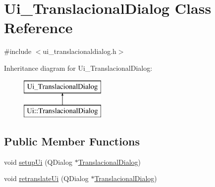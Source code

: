 \hypertarget{class_ui___translacional_dialog}{\section{Ui\-\_\-\-Translacional\-Dialog Class Reference}
\label{class_ui___translacional_dialog}
}


{\ttfamily \#include $<$ui\-\_\-translacionaldialog.\-h$>$}

Inheritance diagram for Ui\-\_\-\-Translacional\-Dialog\-:\begin{figure}[H]
\begin{center}
\leavevmode
\includegraphics[height=2.000000cm]{class_ui___translacional_dialog}
\end{center}
\end{figure}
\subsection*{Public Member Functions}
\begin{DoxyCompactItemize}
\item 
void \hyperlink{class_ui___translacional_dialog_a14ff63c44f093098644e3d5e7b9bcec2}{setup\-Ui} (Q\-Dialog $\ast$\hyperlink{class_translacional_dialog}{Translacional\-Dialog})
\item 
void \hyperlink{class_ui___translacional_dialog_a804a72d6581b2aebc2d1321cb5641e70}{retranslate\-Ui} (Q\-Dialog $\ast$\hyperlink{class_translacional_dialog}{Translacional\-Dialog})
\end{DoxyCompactItemize}
